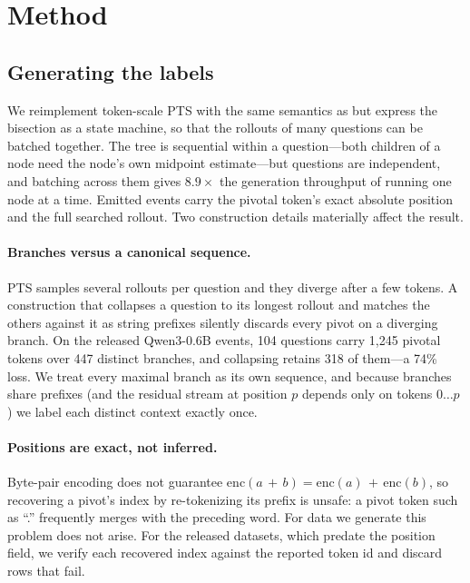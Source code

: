 \documentclass{article}
\begin{document}
\section{Method}
\label{sec:method}

\subsection{Generating the labels}
\label{sec:labels}

We reimplement token-scale PTS with the same semantics as \citet{pts} but
express the bisection as a state machine, so that the rollouts of many
questions can be batched together. The tree is sequential within a
question---both children of a node need the node's own midpoint
estimate---but questions are independent, and batching across them gives
$8.9\times$ the generation throughput of running one node at a time.
Emitted events carry the pivotal token's exact absolute position and the
full searched rollout. Two construction details materially affect the result.

\paragraph{Branches versus a canonical sequence.} PTS samples several
rollouts per question and they diverge after a few tokens. A construction
that collapses a question to its longest rollout and matches the others
against it as string prefixes silently discards every pivot on a diverging
branch. On the released Qwen3-0.6B events, 104 questions carry 1{,}245
pivotal tokens over 447 distinct branches, and collapsing retains 318 of
them---a 74\% loss. We treat every maximal branch as its own sequence, and
because branches share prefixes (and the residual stream at position $p$
depends only on tokens $0\ldots p$) we label each distinct context exactly
once.

\paragraph{Positions are exact, not inferred.} Byte-pair encoding does not
guarantee $\mathrm{enc}(a\,{+}\,b) = \mathrm{enc}(a)\,{+}\,\mathrm{enc}(b)$,
so recovering a pivot's index by re-tokenizing its prefix is unsafe: a
pivot token such as ``.'' frequently merges with the preceding word. For
data we generate this problem does not arise. For the released datasets,
which predate the position field, we verify each recovered index against
the reported token id and discard rows that fail.
\end{document}
